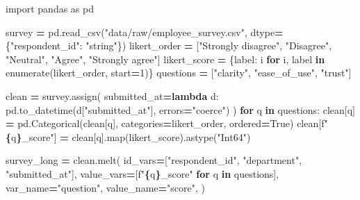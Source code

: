 \documentclass[
  12pt,
]{article}
\newenvironment{Shaded}{\begin{snugshade}}{\end{snugshade}}
\newcommand{\BuiltInTok}[1]{#1}
\newcommand{\ControlFlowTok}[1]{\textcolor[rgb]{0.13,0.29,0.53}{\textbf{#1}}}
\newcommand{\DecValTok}[1]{\textcolor[rgb]{0.00,0.00,0.81}{#1}}
\newcommand{\ImportTok}[1]{#1}
\newcommand{\KeywordTok}[1]{\textcolor[rgb]{0.13,0.29,0.53}{\textbf{#1}}}
\newcommand{\NormalTok}[1]{#1}
\newcommand{\OperatorTok}[1]{\textcolor[rgb]{0.81,0.36,0.00}{\textbf{#1}}}
\newcommand{\SpecialCharTok}[1]{\textcolor[rgb]{0.81,0.36,0.00}{\textbf{#1}}}
\newcommand{\SpecialStringTok}[1]{\textcolor[rgb]{0.31,0.60,0.02}{#1}}
\newcommand{\StringTok}[1]{\textcolor[rgb]{0.31,0.60,0.02}{#1}}
\newcommand{\VariableTok}[1]{\textcolor[rgb]{0.00,0.00,0.00}{#1}}
\begin{document}
\begin{Shaded}
\begin{Highlighting}[]
\ImportTok{import}\NormalTok{ pandas }\ImportTok{as}\NormalTok{ pd}

\NormalTok{survey }\OperatorTok{=}\NormalTok{ pd.read\_csv(}\StringTok{"data/raw/employee\_survey.csv"}\NormalTok{, dtype}\OperatorTok{=}\NormalTok{\{}\StringTok{"respondent\_id"}\NormalTok{: }\StringTok{"string"}\NormalTok{\})}
\NormalTok{likert\_order }\OperatorTok{=}\NormalTok{ [}\StringTok{"Strongly disagree"}\NormalTok{, }\StringTok{"Disagree"}\NormalTok{, }\StringTok{"Neutral"}\NormalTok{, }\StringTok{"Agree"}\NormalTok{, }\StringTok{"Strongly agree"}\NormalTok{]}
\NormalTok{likert\_score }\OperatorTok{=}\NormalTok{ \{label: i }\ControlFlowTok{for}\NormalTok{ i, label }\KeywordTok{in} \BuiltInTok{enumerate}\NormalTok{(likert\_order, start}\OperatorTok{=}\DecValTok{1}\NormalTok{)\}}
\NormalTok{questions }\OperatorTok{=}\NormalTok{ [}\StringTok{"clarity"}\NormalTok{, }\StringTok{"ease\_of\_use"}\NormalTok{, }\StringTok{"trust"}\NormalTok{]}

\NormalTok{clean }\OperatorTok{=}\NormalTok{ survey.assign(}
\NormalTok{    submitted\_at}\OperatorTok{=}\KeywordTok{lambda}\NormalTok{ d: pd.to\_datetime(d[}\StringTok{"submitted\_at"}\NormalTok{], errors}\OperatorTok{=}\StringTok{"coerce"}\NormalTok{)}
\NormalTok{)}
\ControlFlowTok{for}\NormalTok{ q }\KeywordTok{in}\NormalTok{ questions:}
\NormalTok{    clean[q] }\OperatorTok{=}\NormalTok{ pd.Categorical(clean[q], categories}\OperatorTok{=}\NormalTok{likert\_order, ordered}\OperatorTok{=}\VariableTok{True}\NormalTok{)}
\NormalTok{    clean[}\SpecialStringTok{f"}\SpecialCharTok{\{}\NormalTok{q}\SpecialCharTok{\}}\SpecialStringTok{\_score"}\NormalTok{] }\OperatorTok{=}\NormalTok{ clean[q].}\BuiltInTok{map}\NormalTok{(likert\_score).astype(}\StringTok{"Int64"}\NormalTok{)}

\NormalTok{survey\_long }\OperatorTok{=}\NormalTok{ clean.melt(}
\NormalTok{    id\_vars}\OperatorTok{=}\NormalTok{[}\StringTok{"respondent\_id"}\NormalTok{, }\StringTok{"department"}\NormalTok{, }\StringTok{"submitted\_at"}\NormalTok{],}
\NormalTok{    value\_vars}\OperatorTok{=}\NormalTok{[}\SpecialStringTok{f"}\SpecialCharTok{\{}\NormalTok{q}\SpecialCharTok{\}}\SpecialStringTok{\_score"} \ControlFlowTok{for}\NormalTok{ q }\KeywordTok{in}\NormalTok{ questions],}
\NormalTok{    var\_name}\OperatorTok{=}\StringTok{"question"}\NormalTok{,}
\NormalTok{    value\_name}\OperatorTok{=}\StringTok{"score"}\NormalTok{,}
\NormalTok{)}


\end{Highlighting}
\end{Shaded}
\end{document}
